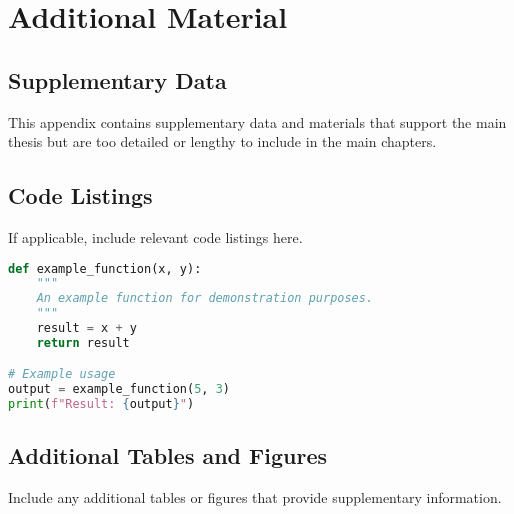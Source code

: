 \chapter{Additional Material}
\label{app:additional}

\section{Supplementary Data}
This appendix contains supplementary data and materials that support the main thesis but are too detailed or lengthy to include in the main chapters.

\section{Code Listings}
If applicable, include relevant code listings here.

\begin{lstlisting}[language=Python, caption=Example Python code]
def example_function(x, y):
    """
    An example function for demonstration purposes.
    """
    result = x + y
    return result

# Example usage
output = example_function(5, 3)
print(f"Result: {output}")
\end{lstlisting}

\section{Additional Tables and Figures}
Include any additional tables or figures that provide supplementary information.
